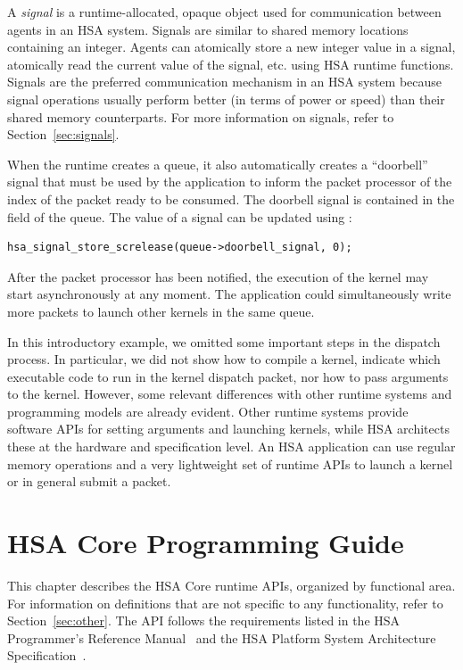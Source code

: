 \documentclass[oneside]{book}
\begin{document}
A \emph{signal} is a runtime-allocated, opaque object used for communication
between agents in an HSA system. Signals are similar to shared memory
locations containing an integer. Agents can atomically store a new integer
value in a signal, atomically read the current value of the signal, etc. using
HSA runtime functions.  Signals are the preferred communication mechanism in an
HSA system because signal operations usually perform better (in terms of power
or speed) than their shared memory counterparts. For more information on
signals, refer to Section~\ref{sec:signals}.

When the runtime creates a queue, it also automatically creates a ``doorbell''
signal that must be used by the application to inform the packet processor of
the index of the packet ready to be consumed. The doorbell signal is contained
in the  field of the queue. The value of a
signal can be updated using :

\begin{lstlisting}
hsa_signal_store_screlease(queue->doorbell_signal, 0);
\end{lstlisting}

After the packet processor has been notified, the execution of the kernel may
start asynchronously at any moment. The application could simultaneously write
more packets to launch other kernels in the same queue.

In this introductory example, we omitted some important steps in the dispatch
process. In particular, we did not show how to compile a kernel, indicate which
executable code to run in the kernel dispatch packet, nor how to pass arguments
to the kernel. However, some relevant differences with other runtime systems and
programming models are already evident.  Other runtime systems provide software
APIs for setting arguments and launching kernels, while HSA architects these at
the hardware and specification level. An HSA application can use regular memory
operations and a very lightweight set of runtime APIs to launch a kernel or in
general submit a packet.


\chapter{HSA Core Programming Guide} \label{coreapi}

This chapter describes the HSA Core runtime APIs, organized by functional
area. For information on definitions that are not specific to any functionality,
refer to Section~\ref{sec:other}. The API follows the requirements listed in the
HSA Programmer's Reference Manual~\cite{prm} and the HSA Platform System
Architecture Specification~\cite{sar}.
\end{document}
